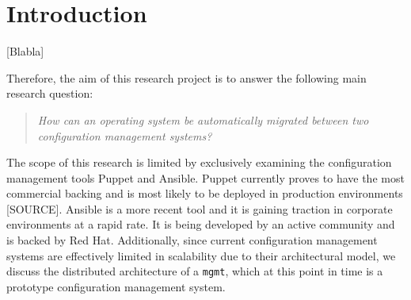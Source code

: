 \section{Introduction}\label{sec:introduction}
[Blabla]

Therefore, the aim of this research project is to answer the following main research question:

\begin{quote}
\textit{How can an operating system be automatically migrated between two configuration management systems?}
\end{quote}

\noindent
The scope of this research is limited by exclusively examining the configuration management tools Puppet and Ansible. Puppet currently proves to have the most commercial backing and is most likely to be deployed in production environments [SOURCE]. Ansible is a more recent tool and it is gaining traction in corporate environments at a rapid rate. It is being developed by an active community and is backed by Red Hat. Additionally, since current configuration management systems are effectively limited in scalability due to their architectural model, we discuss the distributed architecture of a \texttt{mgmt}, which at this point in time is a prototype configuration management system.

